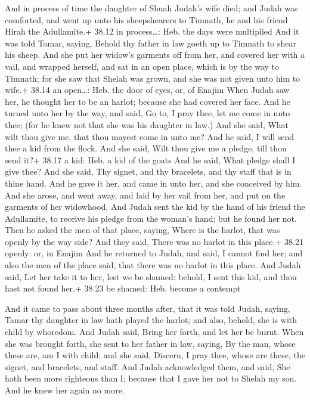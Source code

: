  And in process of time the daughter of Shuah Judah's
wife died; and Judah was comforted, and went up unto his sheepshearers
to Timnath, he and his friend Hirah the Adullamite.+ 38.12 in
process\ldots: Heb. the days were multiplied  And it was
told Tamar, saying, Behold thy father in law goeth up to Timnath to
shear his sheep.  And she put her widow's garments off from
her, and covered her with a vail, and wrapped herself, and sat in an
open place, which is by the way to Timnath; for she saw that Shelah was
grown, and she was not given unto him to wife.+ 38.14 an open\ldots:
Heb. the door of eyes, or, of Enajim  When Judah saw her,
he thought her to be an harlot; because she had covered her face.
 And he turned unto her by the way, and said, Go to, I pray
thee, let me come in unto thee; (for he knew not that she was his
daughter in law.) And she said, What wilt thou give me, that thou mayest
come in unto me?  And he said, I will send thee a kid from
the flock. And she said, Wilt thou give me a pledge, till thou send it?+
38.17 a kid: Heb. a kid of the goats  And he said, What
pledge shall I give thee? And she said, Thy signet, and thy bracelets,
and thy staff that is in thine hand. And he gave it her, and came in
unto her, and she conceived by him.  And she arose, and
went away, and laid by her vail from her, and put on the garments of her
widowhood.  And Judah sent the kid by the hand of his
friend the Adullamite, to receive his pledge from the woman's hand: but
he found her not.  Then he asked the men of that place,
saying, Where is the harlot, that was openly by the way side? And they
said, There was no harlot in this place.+ 38.21 openly: or, in Enajim
 And he returned to Judah, and said, I cannot find her; and
also the men of the place said, that there was no harlot in this place.
 And Judah said, Let her take it to her, lest we be shamed:
behold, I sent this kid, and thou hast not found her.+ 38.23 be shamed:
Heb. become a contempt

 And it came to pass about three months after, that it
was told Judah, saying, Tamar thy daughter in law hath played the
harlot; and also, behold, she is with child by whoredom. And Judah said,
Bring her forth, and let her be burnt.  When she was
brought forth, she sent to her father in law, saying, By the man, whose
these are, am I with child: and she said, Discern, I pray thee, whose
are these, the signet, and bracelets, and staff.  And Judah
acknowledged them, and said, She hath been more righteous than I;
because that I gave her not to Shelah my son. And he knew her again no
more.

